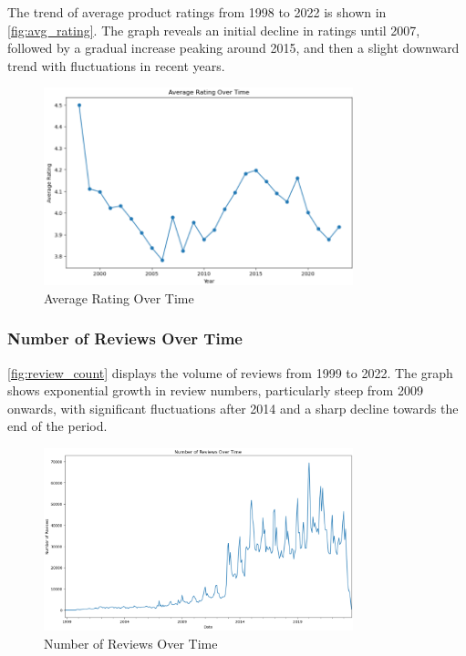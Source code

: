 \documentclass{article}
\begin{document}
The trend of average product ratings from 1998 to 2022 is shown in \autoref{fig:avg_rating}. The graph reveals an initial decline in ratings until 2007, followed by a gradual increase peaking around 2015, and then a slight downward trend with fluctuations in recent years.
\begin{figure}[H]
\centering
\includegraphics[width=0.8\textwidth]{img/avg_rating_over_time.png}
\caption{Average Rating Over Time}
\label{fig:avg_rating}
\end{figure}

\subsubsection{Number of Reviews Over Time}

\autoref{fig:review_count} displays the volume of reviews from 1999 to 2022. The graph shows exponential growth in review numbers, particularly steep from 2009 onwards, with significant fluctuations after 2014 and a sharp decline towards the end of the period.
\begin{figure}[H]
\centering
\includegraphics[width=0.8\textwidth]{img/no_reviews_over_time.png}
\caption{Number of Reviews Over Time}
\label{fig:review_count}
\end{figure}
\end{document}
